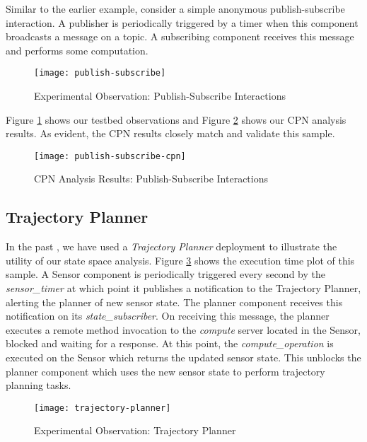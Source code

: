 Similar to the earlier example, consider a simple anonymous publish-subscribe interaction. A publisher is periodically triggered by a timer when this component broadcasts a message on a topic. A subscribing component receives this message and performs some computation.

\begin{figure}[h]
	\centering
	\texttt{[image: publish-subscribe]}
	\caption{Experimental Observation: Publish-Subscribe Interactions}
	\label{fig:publish-subscribe}
\end{figure}
\FloatBarrier

Figure \ref{fig:publish-subscribe} shows our testbed observations and Figure \ref{fig:publish-subscribe-cpn} shows our CPN analysis results. As evident, the CPN results closely match and validate this sample. 

\begin{figure}[h]
	\centering
	\texttt{[image: publish-subscribe-cpn]}
	\caption{CPN Analysis Results: Publish-Subscribe Interactions}
	\label{fig:publish-subscribe-cpn}
\end{figure}
\FloatBarrier

\subsection{Trajectory Planner}

In the past \cite{kumar2014colored}, we have used a \emph{Trajectory Planner} deployment to illustrate the utility of our state space analysis. Figure \ref{fig:trajectory-planner} shows the execution time plot of this sample. A Sensor component is periodically triggered every second by the \emph{sensor\_timer} at which point it publishes a notification to the Trajectory Planner, alerting the planner of new sensor state. The planner component receives this notification on its \emph{state\_subscriber}. On receiving this message, the planner executes a remote method invocation to the \emph{compute} server located in the Sensor, blocked and waiting for a response. At this point, the \emph{compute\_operation} is executed on the Sensor which returns the updated sensor state. This unblocks the planner component which uses the new sensor state to perform trajectory planning tasks. 

\begin{figure}[h]
	\centering
	\texttt{[image: trajectory-planner]}
	\caption{Experimental Observation: Trajectory Planner}
	\label{fig:trajectory-planner}
\end{figure}
\FloatBarrier

